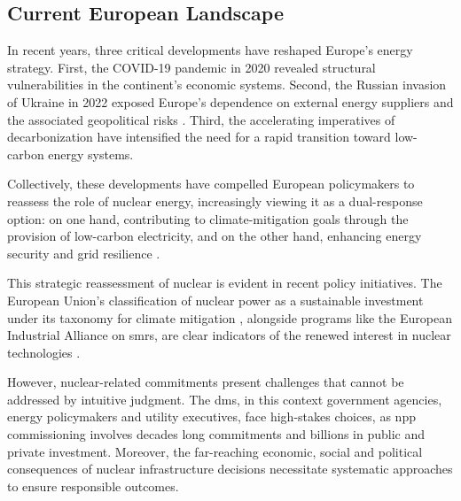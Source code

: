 \subsection{Current European Landscape}
\label{sec:european_landscape}
In recent years, three critical developments have reshaped Europe’s energy strategy. First, the COVID-19 pandemic in 2020 revealed structural vulnerabilities in the continent’s economic systems. Second, the Russian invasion of Ukraine in 2022 exposed Europe’s dependence on external energy suppliers and the associated geopolitical risks \cite{BRODNY2023121443,Sterling_European_Energy_Import_2025,EPRS_Energy_2023}. Third, the accelerating imperatives of decarbonization have intensified the need for a rapid transition toward low-carbon energy systems. 

Collectively, these developments have compelled European policymakers to reassess the role of nuclear energy, increasingly viewing it as a dual-response option: on one hand, contributing to climate-mitigation goals through the provision of low-carbon electricity, and on the other hand, enhancing energy security and grid resilience \cite{EU2050ClimateStrategy}.

This strategic reassessment of nuclear is evident in recent policy initiatives. The European Union's classification of nuclear power as a sustainable investment under its taxonomy for climate mitigation \cite{EUTaxonomy}, alongside programs like the European Industrial Alliance on \glspl{smr}, are clear indicators of the renewed interest in nuclear technologies \cite{EC_SMR_Declaration_2023}.

However, nuclear-related commitments present challenges that cannot be addressed by intuitive judgment. The \glspl{dm}, in this context government agencies, energy policymakers and utility executives, face high-stakes choices, as \gls{npp} commissioning involves decades long commitments and billions in public and private investment. Moreover, the far-reaching economic, social and political consequences of nuclear infrastructure decisions necessitate systematic approaches to ensure responsible outcomes.

